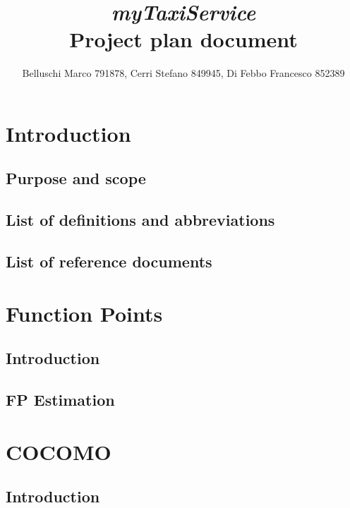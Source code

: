 \documentclass[]{report}
\begin{document}
\title{{\Huge\textit{myTaxiService}}\\{\Large Project plan document}}
\author{Belluschi Marco 791878, Cerri Stefano 849945, Di Febbo Francesco 852389}

\maketitle

\tableofcontents

\chapter{Introduction}

	\section{Purpose and scope}
	
	
	\section{List of definitions and abbreviations}
	

	\section{List of reference documents}
	

\chapter{Function Points}

	\section{Introduction}
	
	
	\section{FP Estimation}
	


\chapter{COCOMO}

	\section{Introduction}
	
	
\end{document}
